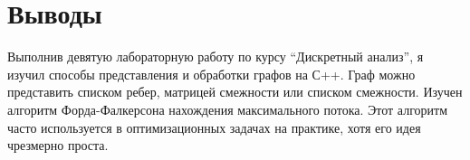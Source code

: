 \section{Выводы}

Выполнив девятую лабораторную работу по курсу \enquote{Дискретный анализ}, я изучил способы представления и обработки графов на С++.
Граф можно представить списком ребер, матрицей смежности или списком смежности.
Изучен алгоритм Форда-Фалкерсона нахождения максимального потока. Этот алгоритм часто используется в оптимизационных задачах на практике, хотя его идея чрезмерно проста.
